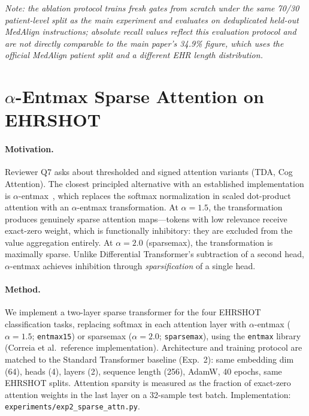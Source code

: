 \documentclass{article}
\begin{document}
\textit{Note: the ablation protocol trains fresh gates from scratch under the
same 70/30 patient-level split as the main experiment and evaluates on
deduplicated held-out MedAlign instructions; absolute recall values reflect
this evaluation protocol and are not directly comparable to the main paper's
34.9\% figure, which uses the official MedAlign patient split and a different
EHR length distribution.}



\section{$\alpha$-Entmax Sparse Attention on EHRSHOT}
\label{app:sparse_attn}

\paragraph{Motivation.}
Reviewer Q7 asks about thresholded and signed attention variants (TDA, Cog
Attention). The closest principled alternative with an established implementation
is $\alpha$-entmax~\cite{correia2019adaptively}, which replaces the softmax
normalization in scaled dot-product attention with an $\alpha$-entmax
transformation. At $\alpha{=}1.5$, the transformation produces genuinely sparse
attention maps---tokens with low relevance receive exact-zero weight, which is
functionally inhibitory: they are excluded from the value aggregation entirely.
At $\alpha{=}2.0$ (sparsemax), the transformation is maximally sparse.
Unlike Differential Transformer's subtraction of a second head, $\alpha$-entmax
achieves inhibition through \emph{sparsification} of a single head.

\paragraph{Method.}
We implement a two-layer sparse transformer for the four EHRSHOT classification
tasks, replacing softmax in each attention layer with $\alpha$-entmax ($\alpha{=}1.5$;
\texttt{entmax15}) or sparsemax ($\alpha{=}2.0$; \texttt{sparsemax}), using the
\texttt{entmax} library (Correia et al.\ reference implementation).
Architecture and training protocol are matched to the Standard Transformer
baseline (Exp.~2): same embedding dim (64), heads (4), layers (2), sequence
length (256), AdamW, 40 epochs, same EHRSHOT splits.
Attention sparsity is measured as the fraction of exact-zero attention weights
in the last layer on a 32-sample test batch.
Implementation: \texttt{experiments/exp2\_sparse\_attn.py}.
\end{document}
